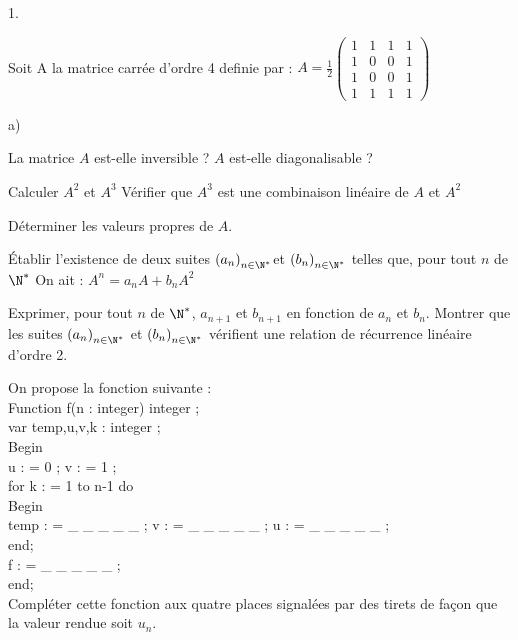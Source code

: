 \documentclass[11pt]{article}%
\begin{document}
\begin{noliste}{1.}
 \setlength{\itemsep}{4mm}
\item Soit A la matrice carrée d'ordre 4 definie par : $A =
\frac{1}{2}\left( 
\begin{array}{cccc}
1 & 1 & 1 & 1 \\
1 & 0 & 0 & 1 \\
1 & 0 & 0 & 1 \\
1 & 1 & 1 & 1
\end{array}
\right) $

\begin{noliste}{a)}
 \setlength{\itemsep}{2mm}
\item La matrice $A$ est-elle inversible ? $A$ est-elle diagonalisable
?

\item Calculer $A^{2}$ et $A^{3}$ Vérifier que $A^{3}$ est une
combinaison linéaire de $A$ et $A^{2}$

\item Déterminer les valeurs propres de $A$.

\item Établir l'existence de deux suites $\left(
a_{n}\right)_{n\in\N^{\ast}}$et $\left( b_{n}\right)_{n\in \N^{\ast}}$
telles
que, pour tout $n$ de $\N^{\ast}$ On ait : $A^{n} = a_{n}A +
b_{n}A^{2}$

\item Exprimer, pour tout $n$ de $\N^{\ast}$, $a_{n + 1}$ et $b_{n +
1}$
en fonction de $a_{n}$ et $b_{n}$. Montrer que les suites $\left(
a_{n}\right)_{n\in \N^{\ast}}$ et $\left( b_{n}\right)_{n\in
\N^{\ast}}$ vérifient une relation de récurrence linéaire
d'ordre 2.
\end{noliste}

\item On propose la fonction \Scilab{} suivante : \\
Function f(n : integer) integer ;\\
var temp,u,v,k : integer ;\\
Begin\\
u : = 0 ; v : = 1 ;\\
for k : = 1 to n-1 do \\
\qquad Begin\\
\qquad temp : = \_ \_ \_ \_ \_ ; v : = \_ \_ \_ \_ \_ ; u : = \_ \_ \_
\_ \_ ;\\
\qquad end;\\
f : = \_ \_ \_ \_ \_ ;\\
end;\\
Compléter cette fonction aux quatre places signalées par des tirets
de façon que la valeur rendue soit $u_{n}$.


\end{noliste}
\end{document}
